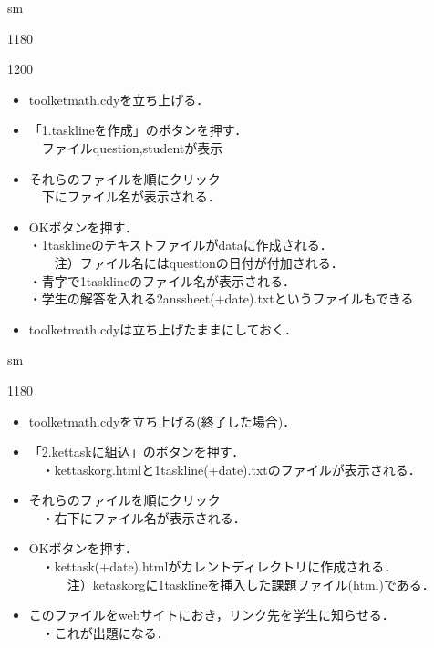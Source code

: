 \documentclass[landscape,10pt]{ujarticle}
\newcommand{\slidepage}[1][s]{%
\setcounter{ketpicctra}{18}%
\if#1m \setcounter{ketpicctra}{1}\fi
\hypersetup{linkcolor=black}%

\begin{layer}{118}{0}
\putnotee{122}{-\theketpicctra.05}{\small\thepage/\pageref{pageend}}
\end{layer}\hypersetup{linkcolor=blue}

}
\begin{document}


\vspace*{18mm}

\slidepage

\begin{layer}{120}{0}
\end{layer}

\begin{itemize}
\item
toolketmath.cdyを立ち上げる．
\item
「1.tasklineを作成」のボタンを押す．\\
　ファイルquestion,studentが表示
\item
それらのファイルを順にクリック\\
　下にファイル名が表示される．
\item
OKボタンを押す．\\
・1tasklineのテキストファイルがdataに作成される．\\
　　注）ファイル名にはquestionの日付が付加される．\\
・青字で1tasklineのファイル名が表示される．\\
・学生の解答を入れる2anssheet(+date).txtというファイルもできる
\item
toolketmath.cdyは立ち上げたままにしておく．
\end{itemize}



\vspace*{18mm}

\slidepage
\begin{itemize}
\item
toolketmath.cdyを立ち上げる(終了した場合)．
\item
「2.kettaskに組込」のボタンを押す．\\
　・kettaskorg.htmlと1taskline(+date).txtのファイルが表示される．
\item
それらのファイルを順にクリック\\
　・右下にファイル名が表示される．
\item
OKボタンを押す．\\
　・kettask(+date).htmlがカレントディレクトリに作成される．\\
　　　注）ketaskorgに1tasklineを挿入した課題ファイル(html)である．
\item
このファイルをwebサイトにおき，リンク先を学生に知らせる．\\
　・これが出題になる．
\end{itemize}
\end{document}

